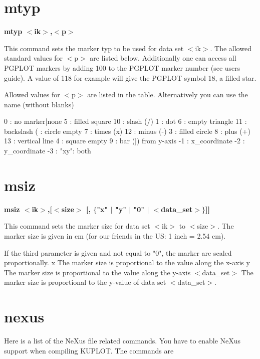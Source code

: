 \section{mtyp}
{\bf mtyp $ <$ik$> $,$ <$p$> $ \par }
\par
\vspace{3pt}
This command sets the marker typ to be used for data set $ <$ik$> $. The 
allowed standard values for $ <$p$> $ are listed below. Additionally one 
can access all PGPLOT markers by adding 100 to the PGPLOT marker 
number (see users guide). A value of 118 for example will give the 
PGPLOT symbol 18, a filled star. 
\par
Allowed values for $ <$p$> $ are listed in the table. Alternatively 
you can use the name (without blanks) 
\par
\begin{MacVerbatim}
  0 : no marker|none  5 : filled square    10 : slash (/)
  1 : dot             6 : empty triangle   11 : backslash ( : circle empty    7 : times (x)        12 : minus (-)
  3 : filled circle   8 : plus  (+)        13 : vertical line
  4 : square empty    9 : bar  (|)              from y-axis
 -1 : x_coordinate   -2 : y_coordinate     -3 : "xy": both
\end{MacVerbatim}
\section{msiz}
{\bf msiz $ <$ik$> $,[$ <$size$> $ [, $ \{$"x" $| $ "y" $| $ "0" $| $ $ <$data\_set$> $$\} $]] \par }
\par
\vspace{3pt}
This command sets the marker size for data set $ <$ik$> $ to $ <$size$> $. 
The marker size is given in cm (for our friends in the US: 
1 inch = 2.54 cm). 
\par
If the third parameter is given and not equal to "0", the marker 
are scaled proportionally. 
x  The marker size is proportional to the value along the x-axis 
y  The marker size is proportional to the value along the y-axis 
$ <$data\_set$> $ The marker size is proportional to the y-value of 
data set $ <$data\_set$> $. 
\section{nexus}
\par
Here is a list of the NeXus file related commands. You have to 
enable NeXus support when compiling KUPLOT. The commands are 
\par
